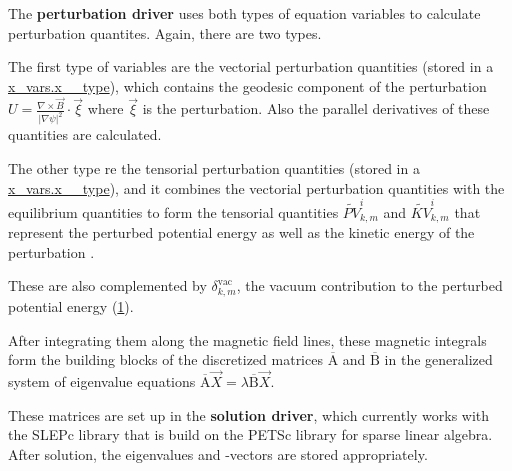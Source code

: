 The {\bfseries perturbation driver} uses both types of equation variables to calculate perturbation quantites. Again, there are two types.
\begin{DoxyItemize}
\item The first type of variables are the vectorial perturbation quantities (stored in a \hyperlink{structx__vars_1_1x__1__type}{x\+\_\+vars.\+x\+\_\+\_\+type}), which contains the geodesic component of the perturbation $U = \frac{\nabla \times \vec{B}}{\left|\nabla \psi\right|^2} \cdot \vec{\xi}$ where $\vec{\xi}$ is the perturbation. Also the parallel derivatives of these quantities are calculated.
\item The other type re the tensorial perturbation quantities (stored in a \hyperlink{structx__vars_1_1x__2__type}{x\+\_\+vars.\+x\+\_\+\_\+type}), and it combines the vectorial perturbation quantities with the equilibrium quantities to form the tensorial quantities $\widetilde{PV}_{k,m}^i$ and $\widetilde{KV}_{k,m}^i$ that represent the perturbed potential energy as well as the kinetic energy of the perturbation \cite{weyens2014theory}.
\end{DoxyItemize}

These are also complemented by $\delta_{k,m}^\text{vac}$, the vacuum contribution to the perturbed potential energy (\hyperlink{page_overview_fng1}{1}).

After integrating them along the magnetic field lines, these magnetic integrals form the building blocks of the discretized matrices $\overline{\text{A}}$ and $\overline{\text{B}}$ in the generalized system of eigenvalue equations $\overline{\text{A}} \vec{X} = \lambda \overline{\text{B}}\vec{X}$.

These matrices are set up in the {\bfseries solution driver}, which currently works with the S\+L\+E\+Pc library that is build on the P\+E\+T\+Sc library for sparse linear algebra. After solution, the eigenvalues and -\/vectors are stored appropriately.

